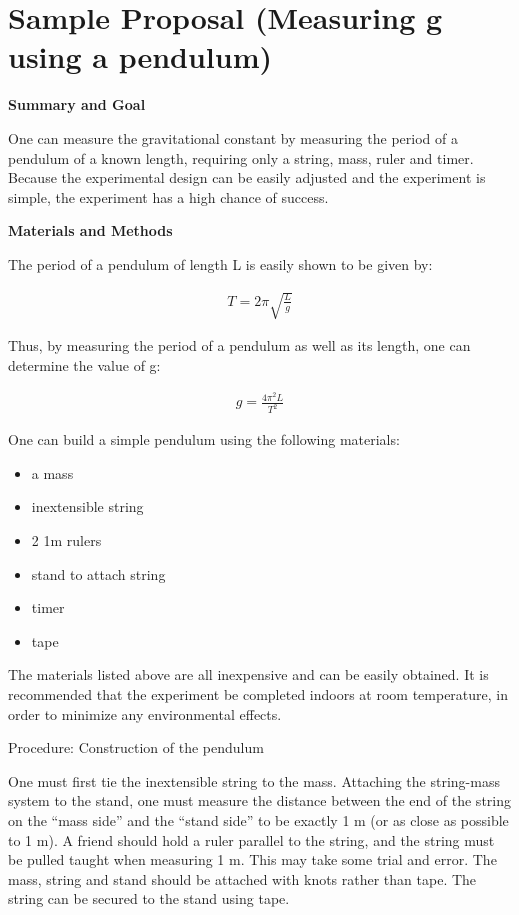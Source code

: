 \newpage
\section{Sample Proposal (Measuring g using a pendulum)}
 \vspace{0.25cm}
\textbf{Summary and Goal}

One can measure the gravitational constant by measuring the period of a pendulum of a known length, requiring only a string, mass, ruler and timer. Because the experimental design can be easily adjusted and the experiment is simple, the experiment has a high chance of success.

\textbf{Materials and Methods}

The period of a pendulum of length L is easily shown to be given by:

\begin{align*}
T=2\pi \sqrt {\frac{L}{g}}
\end{align*}

Thus, by measuring the period of a pendulum as well as its length, one can determine the value of g:

\begin{align*}
g=\frac{4\pi^{2}L}{T^{2}}
\end{align*}

One can build a simple pendulum using the following materials:
\begin{itemize}
\item a mass
\item inextensible string
\item 2 1m rulers
\item stand to attach string
\item timer
\item tape
\end{itemize}

The materials listed above are all inexpensive and can be easily obtained.  It is recommended that the experiment be completed indoors at room temperature, in order to minimize any environmental effects. 

Procedure: Construction of the pendulum

One must first tie the inextensible string to the mass. Attaching the string-mass system to the stand, one must measure the distance between the end of the string on the ``mass side'' and the ``stand side'' to be exactly 1 m (or as close as possible to 1 m). A friend should hold a ruler parallel to the string, and the string must be pulled taught when measuring 1 m. This may take some trial and error. The mass, string and stand should be attached with knots rather than tape. The string can be secured to the stand using tape.

